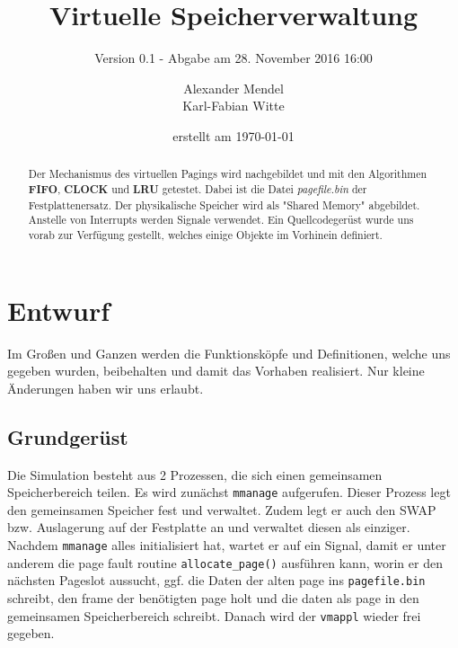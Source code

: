 \documentclass[
   draft=false
  ,paper=a4
  ,twoside=false
  ,fontsize=11pt
  ,headsepline
  ,BCOR10mm
  ,DIV11
  ,parskip=full+
]{scrartcl} %
\begin{document}
\titlehead{Betriebssysteme WS 2016 Praktikum 03}%
\subject{BS Praktikumsaufgabe 03}
\title{Virtuelle Speicherverwaltung}
\subtitle{Version 0.1 - Abgabe am 28. November 2016 16:00}
\author{Alexander Mendel \\ Karl-Fabian Witte}
\date{erstellt am \today}%
\maketitle%
\begin{abstract}
    Der Mechanismus des virtuellen Pagings wird nachgebildet und
    mit den Algorithmen \textbf{FIFO}, \textbf{CLOCK} und \textbf{LRU} 
    getestet. Dabei ist die Datei 
    \emph{pagefile.bin} der Festplattenersatz. Der physikalische Speicher 
    wird als
    "{}Shared Memory"{} abgebildet. Anstelle von Interrupts werden
    Signale verwendet. Ein Quellcodegerüst wurde uns vorab zur 
    Verfügung gestellt, welches einige Objekte im Vorhinein definiert. 
    \end{abstract}
\tableofcontents
\flushleft
\section{Entwurf}
Im Großen und Ganzen werden die Funktionsköpfe und Definitionen, welche 
uns gegeben wurden, beibehalten und damit das Vorhaben realisiert. Nur kleine
Änderungen haben wir uns erlaubt. 

    \subsection{Grundgerüst}
        Die Simulation besteht aus 2 Prozessen, die sich einen gemeinsamen 
        Speicherbereich teilen. Es wird zunächst \texttt{mmanage} aufgerufen. 
        Dieser Prozess legt den gemeinsamen Speicher fest und verwaltet. Zudem 
        legt er auch den SWAP bzw. Auslagerung auf der Festplatte an und 
        verwaltet diesen als einziger. Nachdem \texttt{mmanage} alles 
        initialisiert hat, wartet er auf ein Signal, damit er unter anderem 
        die page fault routine \texttt{allocate\_page()} ausführen kann, worin 
        er den nächsten Pageslot aussucht, ggf. die Daten der alten page ins 
        \texttt{pagefile.bin} schreibt, den frame der benötigten page holt 
        und die daten als page in den gemeinsamen Speicherbereich schreibt. Danach
        wird der \texttt{vmappl} wieder frei gegeben.
        
\end{document}
